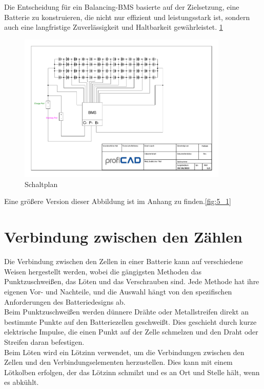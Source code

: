 Die Entscheidung für ein Balancing-BMS basierte auf der Zielsetzung, eine Batterie zu konstruieren, die nicht nur effizient und leistungsstark ist, sondern auch eine langfristige Zuverlässigkeit und Haltbarkeit gewährleistet. \ref{fig:5}\\
\begin{figure}[h]
    \centering
    \includegraphics[width=10cm]{images/Schaltplan.pdf}
    \caption{Schaltplan\cite{LorenzScherrer.02.03.2024}}%
    \label{fig:5}
\end{figure}
Eine größere Version dieser Abbildung ist im Anhang zu finden.\ref{fig:5_1}



\section{Verbindung zwischen den Zählen}

Die Verbindung zwischen den Zellen in einer Batterie kann auf verschiedene Weisen hergestellt werden, wobei die gängigsten Methoden das Punktzuschweißen, das Löten und das Verschrauben sind. Jede Methode hat ihre eigenen Vor- und Nachteile, und die Auswahl hängt von den spezifischen Anforderungen des Batteriedesigns ab.\\

Beim Punktzuschweißen werden dünnere Drähte oder Metallstreifen direkt an bestimmte Punkte auf den Batteriezellen geschweißt. Dies geschieht durch kurze elektrische Impulse, die einen Punkt auf der Zelle schmelzen und den Draht oder Streifen daran befestigen.\\

Beim Löten wird ein Lötzinn verwendet, um die Verbindungen zwischen den Zellen und den Verbindungselementen herzustellen. Dies kann mit einem Lötkolben erfolgen, der das Lötzinn schmilzt und es an Ort und Stelle hält, wenn es abkühlt.\\

